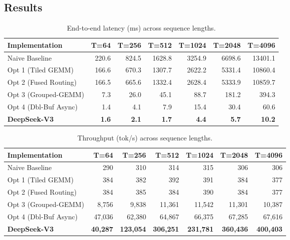 \subsection{Results}

\begin{table}[t]
\centering
\small
\begin{tabular}{lrrrrrr}
\hline\hline
\textbf{Implementation} & \textbf{T=64} & \textbf{T=256} & \textbf{T=512} & \textbf{T=1024} & \textbf{T=2048} & \textbf{T=4096} \\
\hline
Naive Baseline        & 220.6 & 824.5 & 1628.8 & 3254.9 & 6698.6 & 13401.1 \\
Opt 1 (Tiled GEMM)    & 166.6 & 670.3 & 1307.7 & 2622.2 & 5331.4 & 10860.4 \\
Opt 2 (Fused Routing) & 166.5 & 665.6 & 1332.4 & 2628.4 & 5333.9 & 10859.7 \\
Opt 3 (Grouped-GEMM)  &   7.3 &  26.0 &   45.1 &   88.7 &  181.2 &   394.3 \\
Opt 4 (Dbl-Buf Async) &   1.4 &   4.1 &    7.9 &   15.4 &   30.4 &    60.6 \\
\textbf{DeepSeek-V3}  & \textbf{1.6} & \textbf{2.1} & \textbf{1.7} & \textbf{4.4} & \textbf{5.7} & \textbf{10.2} \\
\hline\hline
\end{tabular}
\caption{End-to-end latency (ms) across sequence lengths.}
\label{tab:latency}
\end{table}

\begin{table}[t]
\centering
\small
\begin{tabular}{lrrrrrr}
\hline\hline
\textbf{Implementation} & \textbf{T=64} & \textbf{T=256} & \textbf{T=512} & \textbf{T=1024} & \textbf{T=2048} & \textbf{T=4096} \\
\hline
Naive Baseline        &    290 &    310 &    314 &    315 &    306 &    306 \\
Opt 1 (Tiled GEMM)    &    384 &    382 &    392 &    391 &    384 &    377 \\
Opt 2 (Fused Routing) &    384 &    385 &    384 &    390 &    384 &    377 \\
Opt 3 (Grouped-GEMM)  &  8,756 &  9,838 & 11,361 & 11,542 & 11,301 & 10,387 \\
Opt 4 (Dbl-Buf Async) & 47,036 & 62,380 & 64,867 & 66,375 & 67,285 & 67,616 \\
\textbf{DeepSeek-V3}  & \textbf{40,287} & \textbf{123,054} & \textbf{306,251} & \textbf{231,781} & \textbf{360,436} & \textbf{400,403} \\
\hline\hline
\end{tabular}
\caption{Throughput (tok/s) across sequence lengths.}
\label{tab:throughput}
\end{table}


